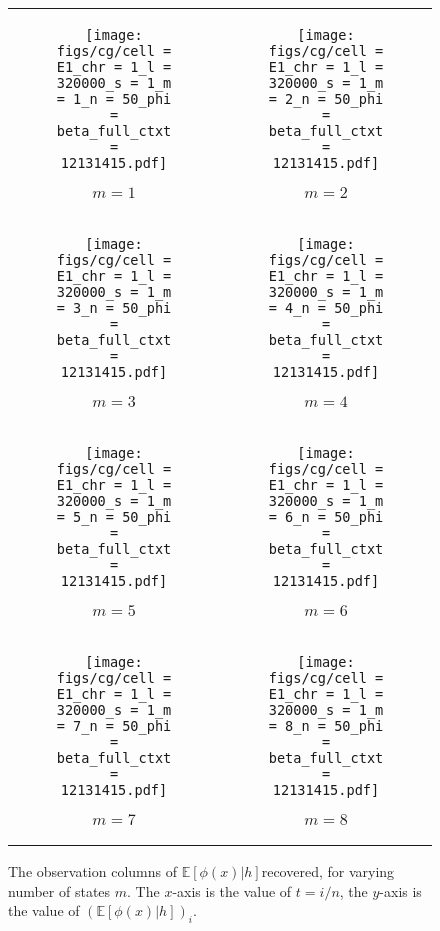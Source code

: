 \documentclass{article}
\def\E{\mathbb{E}}
\begin{document}
\begin{figure}[H]

    \begin{tabular}{cc}
    \begin{subfigure}[t]{0.4\textwidth}
        \texttt{[image: figs/cg/cell = E1\_chr = 1\_l = 320000\_s = 1\_m = 1\_n = 50\_phi = beta\_full\_ctxt = 12131415.pdf]}
        \caption{$m = 1$}
    \end{subfigure}
    &
    \begin{subfigure}[t]{0.4\textwidth}
        \texttt{[image: figs/cg/cell = E1\_chr = 1\_l = 320000\_s = 1\_m = 2\_n = 50\_phi = beta\_full\_ctxt = 12131415.pdf]}
        \caption{$m = 2$}
    \end{subfigure}
    \\
    \begin{subfigure}[t]{0.4\textwidth}
        \texttt{[image: figs/cg/cell = E1\_chr = 1\_l = 320000\_s = 1\_m = 3\_n = 50\_phi = beta\_full\_ctxt = 12131415.pdf]}
        \caption{$m = 3$}
    \end{subfigure}
    &
    \begin{subfigure}[t]{0.4\textwidth}
        \texttt{[image: figs/cg/cell = E1\_chr = 1\_l = 320000\_s = 1\_m = 4\_n = 50\_phi = beta\_full\_ctxt = 12131415.pdf]}
        \caption{$m = 4$}
    \end{subfigure}
    \\
    \begin{subfigure}[t]{0.4\textwidth}
        \texttt{[image: figs/cg/cell = E1\_chr = 1\_l = 320000\_s = 1\_m = 5\_n = 50\_phi = beta\_full\_ctxt = 12131415.pdf]}
        \caption{$m = 5$}
    \end{subfigure}
    &
    \begin{subfigure}[t]{0.4\textwidth}
        \texttt{[image: figs/cg/cell = E1\_chr = 1\_l = 320000\_s = 1\_m = 6\_n = 50\_phi = beta\_full\_ctxt = 12131415.pdf]}
        \caption{$m = 6$}
    \end{subfigure}
    \\
    \begin{subfigure}[t]{0.4\textwidth}
        \texttt{[image: figs/cg/cell = E1\_chr = 1\_l = 320000\_s = 1\_m = 7\_n = 50\_phi = beta\_full\_ctxt = 12131415.pdf]}
        \caption{$m = 7$}
    \end{subfigure}
    &
    \begin{subfigure}[t]{0.4\textwidth}
        \texttt{[image: figs/cg/cell = E1\_chr = 1\_l = 320000\_s = 1\_m = 8\_n = 50\_phi = beta\_full\_ctxt = 12131415.pdf]}
        \caption{$m = 8$}
    \end{subfigure}

    \end{tabular}

    \caption{The observation columns of $\E[\phi(x)|h]$recovered, for varying number of states $m$. The $x$-axis is the value of $t = i/n$, the $y$-axis is the value of $(\E[\phi(x)|h])_i$.}
    \label{fig:varymcg}
\end{figure}
\end{document}
